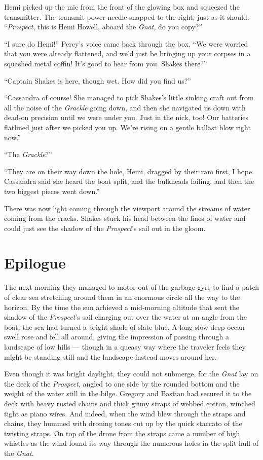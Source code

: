\documentclass[
]{scrbook}
\begin{document}
Hemi picked up the mic from the front of the glowing box and squeezed
the transmitter. The transmit power needle snapped to the right, just as
it should. ``\emph{Prospect}, this is Hemi Howell, aboard the
\emph{Gnat}, do you copy?''

``I sure do Hemi!'' Percy's voice came back through the box. ``We were
worried that you were already flattened, and we'd just be bringing up
your corpses in a squashed metal coffin! It's good to hear from you.
Shakes there?''

``Captain Shakes is here, though wet. How did you find us?''

``Cassandra of course! She managed to pick Shakes's little sinking craft
out from all the noise of the \emph{Grackle} going down, and then she
navigated us down with dead-on precision until we were under you. Just
in the nick, too! Our batteries flatlined just after we picked you up.
We're rising on a gentle ballast blow right now.''

``The \emph{Grackle}?''

``They are on their way down the hole, Hemi, dragged by their ram first,
I hope. Cassandra said she heard the boat split, and the bulkheads
failing, and then the two biggest pieces went down.''

There was now light coming through the viewport around the streams of
water coming from the cracks. Shakes stuck his head between the lines of
water and could just see the shadow of the \emph{Prospect}'s sail out in
the gloom.

\newpage

\hypertarget{epilogue}{%
\section{Epilogue}\label{epilogue}}

The next morning they managed to motor out of the garbage gyre to find a
patch of clear sea stretching around them in an enormous circle all the
way to the horizon. By the time the sun achieved a mid-morning altitude
that sent the shadow of the \emph{Prospect}'s sail charging out over the
water at an angle from the boat, the sea had turned a bright shade of
slate blue. A long slow deep-ocean swell rose and fell all around,
giving the impression of passing through a landscape of low hills ---
though in a queasy way where the traveler feels they might be standing
still and the landscape instead moves around her.

Even though it was bright daylight, they could not submerge, for the
\emph{Gnat} lay on the deck of the \emph{Prospect}, angled to one side
by the rounded bottom and the weight of the water still in the bilge.
Gregory and Bastian had secured it to the deck with heavy rusted chains
and thick grimy straps of webbed cotton, winched tight as piano wires.
And indeed, when the wind blew through the straps and chains, they
hummed with droning tones cut up by the quick staccato of the twisting
straps. On top of the drone from the straps came a number of high
whistles as the wind found its way through the numerous holes in the
split hull of the \emph{Gnat}.
\end{document}
